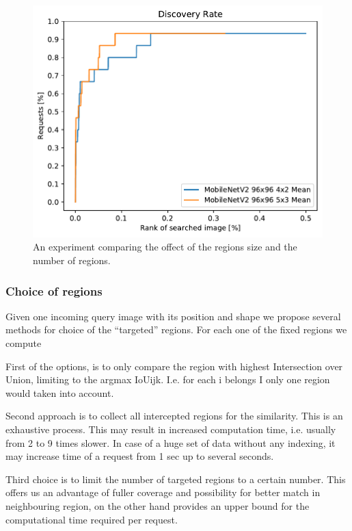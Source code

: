 \begin{figure}
\centering
\includegraphics[width=\textwidth]{graphs/78f2a977489ac08dddac6f53446b388292306ec95f9dcbc7ca8359fbedfed9b0}
\caption{An experiment comparing the offect of the regions size and the number of regions.}
\label{fig:different_number_regions}
\end{figure}


\subsubsection{Choice of regions}

Given one incoming query image with its position and shape we propose several methods for choice of the “targeted” regions. For each one of the fixed regions we compute %

First of the options, is to only compare the region with highest Intersection over Union, limiting to the argmax IoUijk. I.e. for each i belongs I only one region would taken into account.

Second approach is to collect all intercepted regions for the similarity. This is an exhaustive process. This may result in increased computation time, i.e. usually from 2 to 9 times slower. In case of a huge set of data without any indexing, it may increase time of a request from 1 sec up to several seconds.

Third choice is to limit the number of targeted regions to a certain number. This offers us an advantage of fuller coverage and possibility for better match in neighbouring region, on the other hand provides an upper bound for the computational time required per request. 

